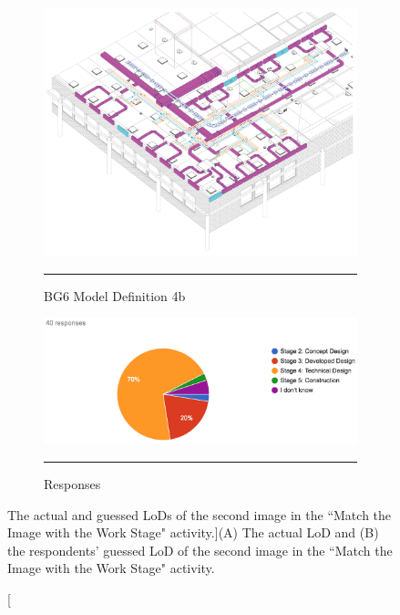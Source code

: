 \begin{figure}[htbp]
\centering
  \begin{subfigure}[b]{.35\textwidth}
  \centering
  \includegraphics[width=\textwidth]{figures/4bModel01.png}
 		\rule{\textwidth}{0.5pt} %
  \caption{BG6 Model Definition 4b}
  \label{}
\end{subfigure}
  \begin{subfigure}[b]{.61\textwidth}
  \centering
  \includegraphics[width=\textwidth]{figures/image2.png}
		\rule{\textwidth}{0.5pt} %
  \caption{Responses}
  \label{}
\end{subfigure}
\caption[The actual and guessed LoDs of the second image in the ``Match the Image with the Work Stage" activity.]{({\scriptsize A}) The actual LoD and ({\scriptsize B}) the respondents’ guessed LoD of the second image in the ``Match the Image with the Work Stage" activity.}
\label{image2}
\end{figure}



